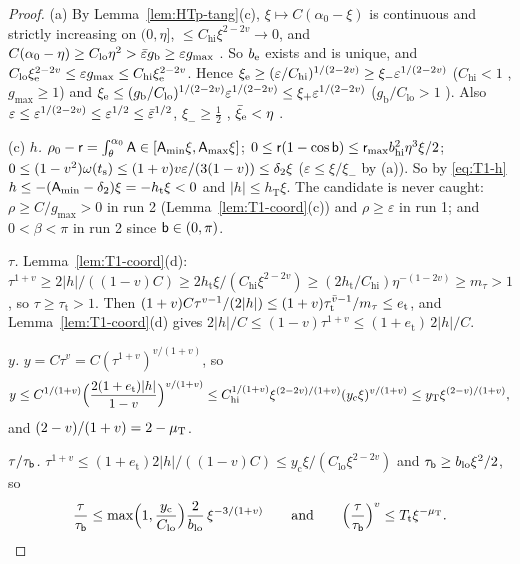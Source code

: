 \begin{proof}
(a) By Lemma~\ref{lem:HTp-tang}(c), $\xi\mapsto C(\alpha_0-\xi)$ is continuous and strictly increasing on $(0,\eta]$, $\le C_{\mathrm{hi}}\xi^{2-2v}
\to0$, and $C(\alpha_0-\eta)\ge C_{\mathrm{lo}}\eta^2>\bar\varepsilon g_{\mathrm b}\ge\varepsilon g_{\max}$ . So $b_{\mathrm e}$ exists and is unique, and
$C_{\mathrm{lo}}\xi_{\mathrm e}^{2-2v}\le\varepsilon g_{\max}\le C_{\mathrm{hi}}\xi_{\mathrm e}^{2-2v}$. Hence $\xi_{\mathrm e}\ge(\varepsilon/C_{\mathrm{hi}})^{1/(2-2v)}\ge
\xi_-\varepsilon^{1/(2-2v)}$ ($C_{\mathrm{hi}}<1$ , $g_{\max}\ge1$) and $\xi_{\mathrm e}\le(g_{\mathrm b}/C_{\mathrm{lo}})^{1/(2-2v)}
\varepsilon^{1/(2-2v)}\le\xi_+\varepsilon^{1/(2-2v)}$ ($g_{\mathrm b}/C_{\mathrm{lo}}>1$ ). Also
$\varepsilon\le\varepsilon^{1/(2-2v)}\le\varepsilon^{1/2}\le\bar\varepsilon^{1/2}$, $\xi_-\ge\frac12$ , $\bar\xi_{\mathrm e}<\eta$ .

(c) \emph{$h$.} $\rho_0-\mathsf r=\int_\theta^{\alpha_0}\mathsf A\in[\mathsf A_{\min}\xi,\mathsf A_{\max}\xi]$; $0\le\mathsf r(1-\cos\mathsf b)\le\mathsf r_{\max}b_{\mathrm{hi}}^2\eta^3\xi/2$;
$0\le(1-v^2)\omega(t_{\mathrm s})\le(1+v)v\varepsilon/(3(1-v))\le\delta_2\xi$ ($\varepsilon\le\xi/\xi_-$ by (a)). So by \eqref{eq:T1-h}
$h\le-(\mathsf A_{\min}-\delta_2)\xi=-h_{\mathrm t}\xi<0$  and $|h|\le h_{\mathrm T}\xi$. The candidate is never caught: $\rho\ge
C/g_{\max}>0$ in run 2 (Lemma~\ref{lem:T1-coord}(c)) and $\rho\ge\varepsilon$ in run 1; and $0<\beta<\pi$ in run 2 since $\mathsf b\in(0,\pi)$.

\emph{$\tau$.} Lemma~\ref{lem:T1-coord}(d): $\tau^{1+v}\ge2|h|/((1-v)C)\ge2h_{\mathrm t}\xi/(C_{\mathrm{hi}}\xi^{2-2v})\ge
(2h_{\mathrm t}/C_{\mathrm{hi}})\eta^{-(1-2v)}\ge m_\tau>1$ , so $\tau\ge\tau_{\mathrm t}>1$. Then
$(1+v)C\tau^{v-1}/(2|h|)\le(1+v)\tau_{\mathrm t}^{\bar v-1}/m_\tau\le e_{\mathrm t}$, and Lemma~\ref{lem:T1-coord}(d) gives
$2|h|/C\le(1-v)\tau^{1+v}\le(1+e_{\mathrm t})\,2|h|/C$.

\emph{$y$.} $y=C\tau^v=C(\tau^{1+v})^{v/(1+v)}$, so
\[
y\le C^{1/(1+v)}\Bigl(\frac{2(1+e_{\mathrm t})|h|}{1-v}\Bigr)^{v/(1+v)}\le
C_{\mathrm{hi}}^{1/(1+v)}\xi^{(2-2v)/(1+v)}(y_{\mathrm c}\xi)^{v/(1+v)}\le y_{\mathrm T}\xi^{(2-v)/(1+v)},
\]
and $(2-v)/(1+v)=2-\mu_{\mathrm T}$.

\emph{$\tau/\tau_{\mathsf b}$.} $\tau^{1+v}\le(1+e_{\mathrm t})2|h|/((1-v)C)\le y_{\mathrm c}\xi/(C_{\mathrm{lo}}\xi^{2-2v})$ and
$\tau_{\mathsf b}\ge b_{\mathrm{lo}}\xi^2/2$, so
\[
\frac\tau{\tau_{\mathsf b}}\le\max\Bigl(1,\frac{y_{\mathrm c}}{C_{\mathrm{lo}}}\Bigr)\frac2{b_{\mathrm{lo}}}\,\xi^{-3/(1+v)}\qquad\text{and}\qquad
\Bigl(\frac\tau{\tau_{\mathsf b}}\Bigr)^v\le T_{\mathrm t}\xi^{-\mu_{\mathrm T}}.
\]


\end{proof}
